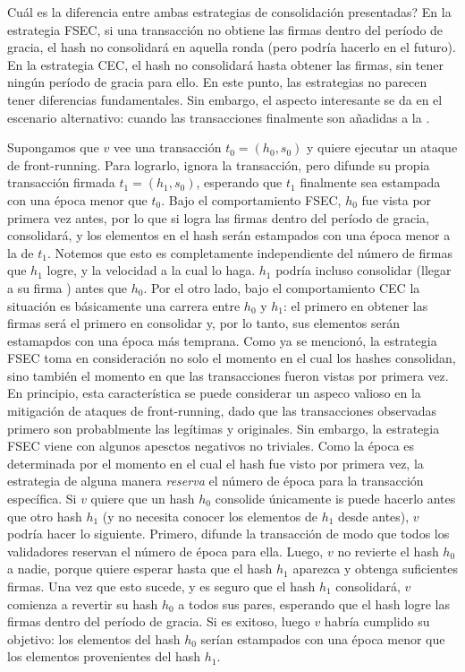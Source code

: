 Cuál es la diferencia entre ambas estrategias de consolidación presentadas?
%
En la estrategia FSEC, si una transacción no obtiene las \SPH firmas
dentro del período de gracia, el hash no consolidará en aquella ronda (pero podría hacerlo
en el futuro).
%
En la estrategia CEC, el hash no consolidará hasta obtener las \SPH firmas,
sin tener ningún período de gracia para ello.
%
En este punto, las estrategias no parecen tener diferencias fundamentales. Sin embargo, el aspecto
interesante se da en el escenario alternativo: cuando las transacciones finalmente son añadidas a la
\setchain.
%

Supongamos que $v$ vee una transacción $t_0 = (h_0, s_0)$ y quiere ejecutar un ataque de front-running.
Para lograrlo, ignora la transacción, pero difunde su propia transacción firmada $t_1 = (h_1, s_0)$,
esperando que $t_1$ finalmente sea estampada con una época menor que $t_0$.
%
Bajo el comportamiento FSEC, $h_0$ fue vista por primera vez antes, por lo que si logra las
\SPH firmas dentro del período de gracia, consolidará, y los elementos
en el hash serán estampados con una época menor a la de $t_1$.
%
Notemos que esto es completamente independiente del número de firmas que $h_1$ logre, y la velocidad
a la cual lo haga. $h_1$ podría incluso consolidar (llegar a su firma \SPH)
antes que $h_0$.
%
Por el otro lado, bajo el comportamiento CEC la situación es básicamente una carrera entre $h_0$ y
$h_1$: el primero en obtener las \SPH firmas será el primero en consolidar y,
por lo tanto, sus elementos serán estamapdos con una época más temprana.
%
Como ya se mencionó, 
la estrategia FSEC toma en consideración no solo el momento en el cual los hashes consolidan, sino
también el momento en que las transacciones fueron vistas por primera vez.
%
En principio, esta característica se puede considerar un aspeco valioso en la mitigación de ataques
de front-running, dado que las transacciones observadas primero son probablmente las legítimas y
originales.
Sin embargo, la estrategia FSEC viene con algunos apesctos negativos no triviales.
%
Como la época es determinada por el momento en el cual el hash fue visto por primera vez, 
la estrategia de alguna manera \textit{reserva} el número de época para la transacción específica.
Si $v$ quiere que un hash $h_0$ consolide únicamente is puede hacerlo antes que otro hash
$h_1$ (y no necesita conocer los elementos de $h_1$ desde antes), $v$ podría hacer lo siguiente.
%
Primero, difunde la transacción de modo que todos los validadores reservan el número de época para ella.
%
Luego, $v$ no revierte el hash $h_0$ a nadie, porque quiere esperar hasta que el hash $h_1$ aparezca
y obtenga suficientes firmas.
%
Una vez que esto sucede, y es seguro que el hash $h_1$ consolidará, $v$ comienza a revertir su hash
$h_0$ a todos sus pares, esperando que el hash logre las \SPH firmas
dentro del período de gracia.
Si es exitoso, luego $v$ habría cumplido su objetivo: los elementos del hash $h_0$ serían estampados
con una época menor que los elementos provenientes del hash $h_1$.
%

